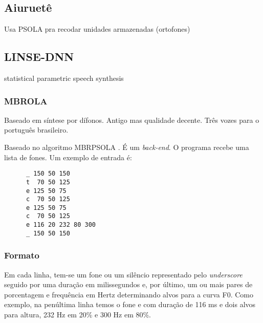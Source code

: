 \subsection{Aiuruetê}
Usa PSOLA pra recodar unidades armazenadas (ortofones)
\subsection{LINSE-DNN}
statistical parametric speech synthesis
\cite{dnnpt}

\subsubsection{MBROLA}
Baseado em síntese por dífonos. Antigo mas qualidade decente. Três vozes para o
português brasileiro. \cite{mbrola} %

Baseado no algoritmo {MBRPSOLA} \cite{mbrpsola}. É um \emph{back-end}. O programa recebe uma lista de fones. Um exemplo de entrada é:

\begin{lstlisting}
      _ 150 50 150
      t  70 50 125
      e 125 50 75
      c  70 50 125
      e 125 50 75
      c  70 50 125
      e 116 20 232 80 300
      _ 150 50 150
\end{lstlisting}

\subsubsection{Formato}
Em cada linha, tem-se um fone ou um silêncio representado pelo \emph{underscore} seguido por uma duração em milissegundos e, por último, um ou mais pares de porcentagem e frequência em Hertz determinando alvos para a curva F0. Como exemplo, na penúltima linha temos o fone \/e\/ com duração de 116 ms e dois alvos para altura, 232 Hz em 20\% e 300 Hz em 80\%.

